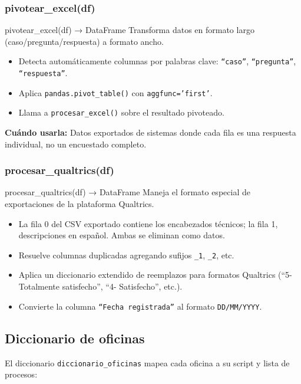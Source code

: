\documentclass[12pt, letterpaper]{article}
\begin{document}
\subsubsection{pivotear\_excel(df)}

\begin{apibox}{pivotear\_excel(df) → DataFrame}
Transforma datos en formato largo (caso/pregunta/respuesta) a formato ancho.
\begin{itemize}
  \item Detecta automáticamente columnas por palabras clave: \texttt{``caso''}, \texttt{``pregunta''}, \texttt{``respuesta''}.
  \item Aplica \texttt{pandas.pivot\_table()} con \texttt{aggfunc='first'}.
  \item Llama a \texttt{procesar\_excel()} sobre el resultado pivoteado.
\end{itemize}
\textbf{Cuándo usarla:} Datos exportados de sistemas donde cada fila es una respuesta individual, no un encuestado completo.
\end{apibox}

\subsubsection{procesar\_qualtrics(df)}

\begin{apibox}{procesar\_qualtrics(df) → DataFrame}
Maneja el formato especial de exportaciones de la plataforma Qualtrics.
\begin{itemize}
  \item La fila 0 del CSV exportado contiene los encabezados técnicos; la fila 1, descripciones en español. Ambas se eliminan como datos.
  \item Resuelve columnas duplicadas agregando sufijos \texttt{\_1}, \texttt{\_2}, etc.
  \item Aplica un diccionario extendido de reemplazos para formatos Qualtrics (``5- Totalmente satisfecho'', ``4- Satisfecho'', etc.).
  \item Convierte la columna \texttt{``Fecha registrada''} al formato \texttt{DD/MM/YYYY}.
\end{itemize}
\end{apibox}

\subsection{Diccionario de oficinas}

El diccionario \texttt{diccionario\_oficinas} mapea cada oficina a su script y lista de procesos:
\end{document}
